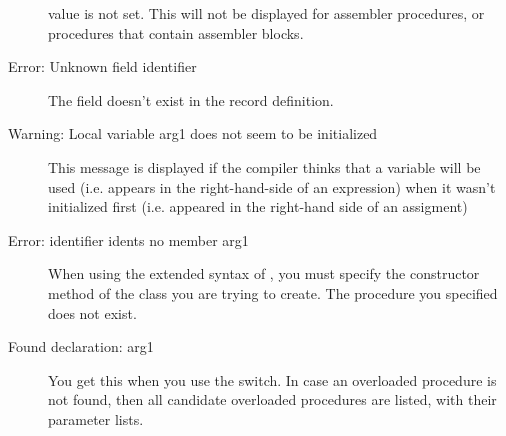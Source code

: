 \begin{description}
 value is not set. This will not be displayed for assembler procedures, 
 or procedures that contain assembler blocks.
\item [Error: Unknown field identifier]
 The field doesn't exist in the record definition.
\item [Warning: Local variable arg1 does not seem to be initialized]
 This message is displayed if the compiler thinks that a variable will
 be used (i.e. appears in the right-hand-side of an expression) when it
 wasn't initialized first (i.e. appeared in the right-hand side of an
 assigment)
\item [Error: identifier idents no member arg1]
 When using the extended syntax of , you must specify the constructor
 method of the class you are trying to create. The procedure you specified
 does not exist.
\item [Found declaration: arg1]
 You get this when you use the  switch. In case an overloaded
 procedure is not found, then all candidate overloaded procedures are
 listed, with their parameter lists.
 \end{description}
